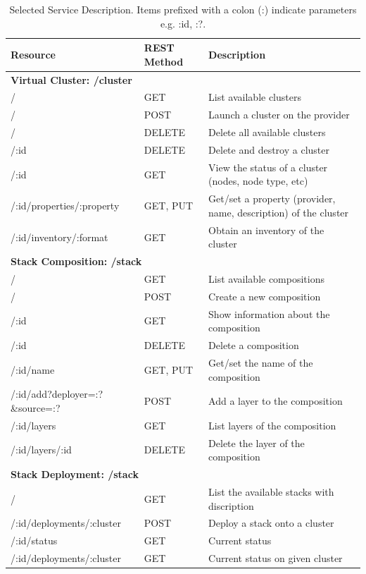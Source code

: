 \documentclass[9pt,twocolumn,twoside]{styles/osajnl}
\newcommand{\grey}{\cellcolor{lightgray}}  %
\newcommand{\blue}{\cellcolor{gray}}  %
\begin{document}
\begin{table}[htb]
  \caption{Selected Service Description. Items prefixed with a colon (:) indicate parameters e.g. :id, :?.}
  \label{T:rest}
  \bigskip
  \begin{center}
    \begin{small}
      \begin{tabular}{|l|l|l|}
        \hline
        \blue \textbf{Resource} & \blue \textbf{REST Method} & \blue \textbf{Description}\tabularnewline

\hline \multicolumn{3}{|l|}{\grey\bf Virtual Cluster: /cluster} \tabularnewline \hline
/                         & GET      & List available clusters \tabularnewline \hline
/                         & POST     & Launch a cluster on the provider \tabularnewline \hline
/                         & DELETE   & Delete all available clusters \tabularnewline \hline
/:id                      & DELETE   & Delete and destroy a cluster \tabularnewline \hline
/:id                      & GET      & View the status of a cluster (nodes, node type, etc) \tabularnewline \hline
/:id/properties/:property & GET, PUT & Get/set a property (provider, name, description) of the cluster \tabularnewline \hline
/:id/inventory/:format    & GET      & Obtain an inventory of the cluster \tabularnewline \hline

\hline \multicolumn{3}{|l|}{\grey\bf Stack Composition: /stack} \tabularnewline \hline
/                               & GET      & List available compositions \tabularnewline \hline
/                               & POST     & Create a new composition \tabularnewline \hline
/:id                            & GET      & Show information about the composition \tabularnewline \hline
/:id                            & DELETE   & Delete a composition \tabularnewline \hline
/:id/name                       & GET, PUT & Get/set the name of the composition \tabularnewline \hline
/:id/add?deployer=:?\&source=:? & POST     & Add a layer to the composition \tabularnewline \hline
/:id/layers                     & GET      & List layers of the composition \tabularnewline \hline
/:id/layers/:id                 & DELETE   & Delete the layer of the composition \tabularnewline \hline

\hline \multicolumn{3}{|l|}{\grey\bf Stack Deployment: /stack} \tabularnewline \hline
/                         & GET  & List the available stacks with discription \tabularnewline \hline
/:id/deployments/:cluster & POST & Deploy a stack onto a cluster \tabularnewline \hline
/:id/status               & GET  & Current status \tabularnewline \hline
/:id/deployments/:cluster & GET  & Current status on given cluster \tabularnewline \hline


\end{tabular}
\end{small}
\end{center}
\end{table}
\end{document}
